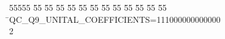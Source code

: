 %
%
\begin{tabbing}
55555 \= 55 \= 55 \= 55 \= 55 \= 55 \= 55 \= 55 \= 55 \= 55 \= 55 \= 55 \= 55 \= \>QC\_Q9\_UNITAL\_COEFFICIENTS=111000000000000\\[0pt]
2\>\end{tabbing}
